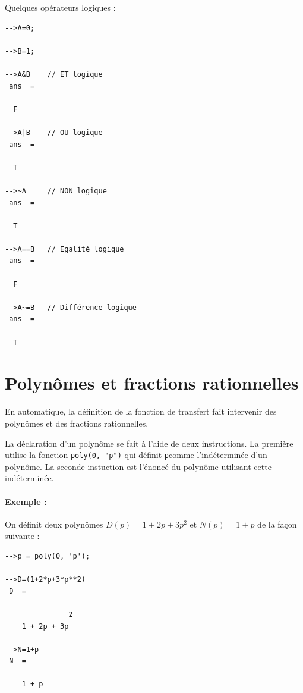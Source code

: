 Quelques opérateurs logiques : 
\begin{code}
\begin{verbatim}
-->A=0;

-->B=1;

-->A&B    // ET logique
 ans  =
 
  F 

-->A|B    // OU logique
 ans  =
 
  T 

-->~A     // NON logique
 ans  =
 
  T 

-->A==B   // Egalité logique
 ans  =
 
  F

-->A~=B   // Différence logique
 ans  =
 
  T
\end{verbatim}
\end{code}


\section{Polynômes et fractions rationnelles}
En automatique, la définition de la fonction de transfert 
fait intervenir des polynômes et des fractions rationnelles.

La déclaration d'un polynôme se fait à l'aide de deux instructions. 
La première utilise la fonction \verb?poly(0, "p")? qui définit 
\og \verb?p?\fg comme l'indéterminée d'un polynôme. 
La seconde instuction est l'énoncé du polynôme utilisant cette indéterminée. 

\paragraph{Exemple :}

On définit deux polynômes $D(p)=1+2p+3p^2$ et $N(p)=1+p$ de la façon 
suivante :
\begin{code}
\begin{verbatim}
-->p = poly(0, 'p');

-->D=(1+2*p+3*p**2)
 D  =
 
               2  
    1 + 2p + 3p 

-->N=1+p
 N  =
 
    1 + p
\end{verbatim}
\end{code}

